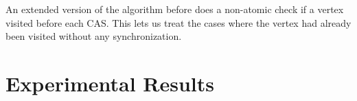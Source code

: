 \documentclass[letterpaper]{article}
\begin{document}
	An extended version of the algorithm before does a non-atomic check if a vertex visited before each CAS. 
	This lets us treat the cases where the vertex had already been visited without any synchronization.
	
	
	
	
	
	
	
	
	\section{Experimental Results}\label{sec:exp}
	
\end{document}
